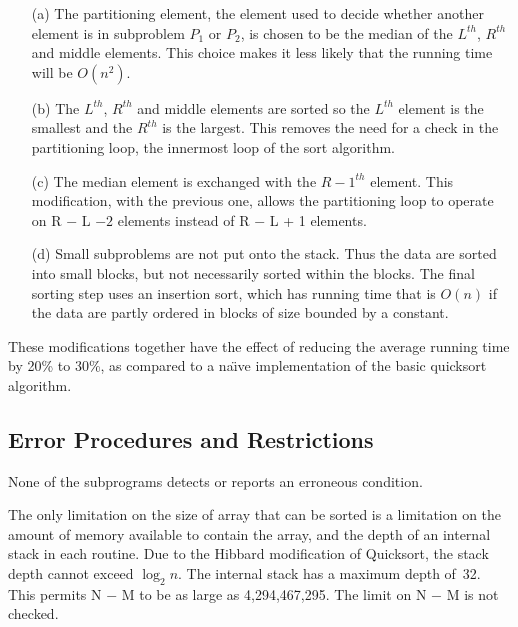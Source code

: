 \documentclass[twoside]{MATH77}
\begin{document}
\begin{itemize}
\item[(a)]  The partitioning element, the element used to decide whether
another element is in subproblem $P_1$ or $P_2$, is chosen to be the median
of the $L^{th}$, $R^{th}$ and middle elements. This choice makes it less
likely that the running time will be $O(n^2)$.

\item[(b)]  The $L^{th}$, $R^{th}$ and middle elements are sorted so the $%
L^{th}$ element is the smallest and the $R^{th}$ is the largest. This
removes the need for a check in the partitioning loop, the innermost loop of
the sort algorithm.

\item[(c)]  The median element is exchanged with the $R-1^{th}$ element. This
modification, with the previous one, allows the partitioning loop to operate
on R $-$ L $-2$ elements instead of R $-$ L + 1 elements.

\item[(d)]  Small subproblems are not put onto the stack. Thus the data are
sorted into small blocks, but not necessarily sorted within the blocks. The
final sorting step uses an insertion sort, which has running time that is $%
O(n)$ if the data are partly ordered in blocks of size bounded by a constant.
\end{itemize}

These modifications together have the effect of reducing the average running
time by 20\% to 30\%, as compared to a na\"\i ve implementation of the basic
quicksort algorithm.

\nocite{Sedgewick:1983:A}



\subsection{Error Procedures and Restrictions}

None of the subprograms detects or reports an erroneous condition.

The only limitation on the size of array that can be sorted is a limitation
on the amount of memory available to contain the array, and the depth of an
internal stack in each routine. Due to the Hibbard modification of
Quicksort, the stack depth cannot exceed $\log _2 n$. The internal stack has
a maximum depth of~32. This permits N $-$ M to be as large as 4,294,467,295.
The limit on N $-$ M is not checked.
\end{document}
